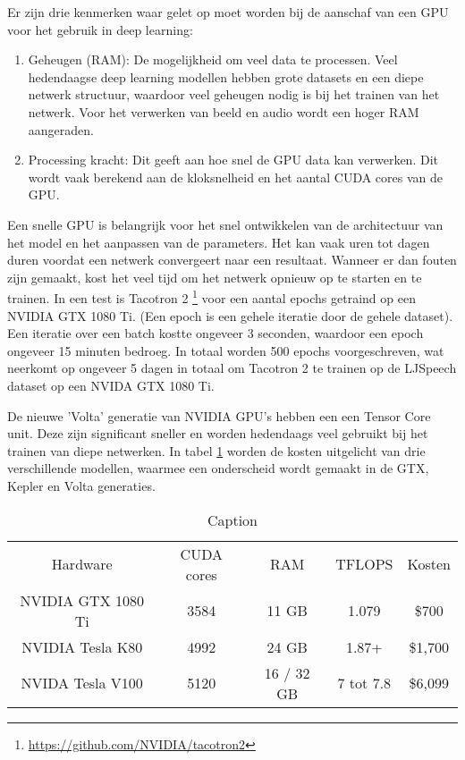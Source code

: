 Er zijn drie kenmerken waar gelet op moet worden bij de aanschaf van een GPU voor het gebruik in deep learning:
\begin{enumerate}
    \item Geheugen (RAM): De mogelijkheid om veel data te processen. Veel hedendaagse deep learning modellen hebben grote datasets en een diepe netwerk structuur, waardoor veel geheugen nodig is bij het trainen van het netwerk. Voor het verwerken van beeld en audio wordt een hoger RAM aangeraden.
    \item Processing kracht: Dit geeft aan hoe snel de GPU data kan verwerken. Dit wordt vaak berekend aan de kloksnelheid en het aantal CUDA cores van de GPU. 
\end{enumerate}

Een snelle GPU is belangrijk voor het snel ontwikkelen van de architectuur van het model en het aanpassen van de parameters. Het kan vaak uren tot dagen duren voordat een netwerk convergeert naar een resultaat. Wanneer er dan fouten zijn gemaakt, kost het veel tijd om het netwerk opnieuw op te starten en te trainen. In een test is Tacotron 2 \footnote{\url{https://github.com/NVIDIA/tacotron2}} voor een aantal epochs getraind op een NVIDIA GTX 1080 Ti. (Een epoch is een gehele iteratie door de gehele dataset). Een iteratie over een batch kostte ongeveer 3 seconden, waardoor een epoch ongeveer 15 minuten bedroeg. In totaal worden 500 epochs voorgeschreven, wat neerkomt op ongeveer 5 dagen in totaal om Tacotron 2 te trainen op de LJSpeech dataset op een NVIDA GTX 1080 Ti.

De nieuwe 'Volta' generatie van NVIDIA GPU's hebben een een Tensor Core unit. Deze zijn significant sneller en worden hedendaags veel gebruikt bij het trainen van diepe netwerken. In tabel \ref{tab:gpus} worden de kosten uitgelicht van drie verschillende modellen, waarmee een onderscheid wordt gemaakt in de GTX, Kepler en Volta generaties.

\begin{table}[H]
    \centering
    \begin{tabular}{c|c|c|c|c}
        Hardware & CUDA cores & RAM & TFLOPS &  Kosten \\
        NVIDIA GTX 1080 Ti & 3584 & 11 GB & 1.079 & \$700 \\
        NVIDIA Tesla K80 & 4992 &  24 GB & 1.87+ & \$1,700 \\
        NVIDA Tesla V100 & 5120 & 16 / 32 GB & 7 tot 7.8 & \$6,099 \\
    \end{tabular}
    \caption{Caption}
    \label{tab:gpus}
\end{table}

